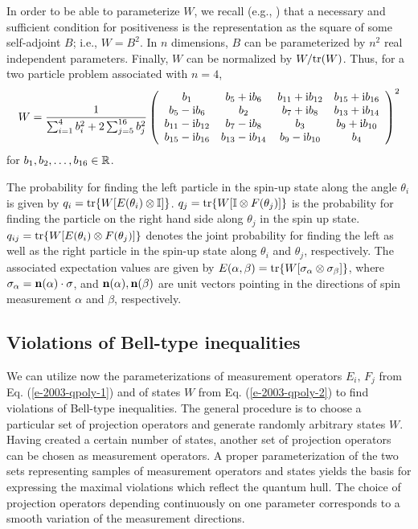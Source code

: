 In order to be able to parameterize $W$,
we recall (e.g., \cite[\S 72]{halmos-vs})
that a necessary and sufficient condition for
positiveness is the representation as the square of
some self-adjoint $B$; i.e., $W=B^2$.
In $n$ dimensions, $B$ can be parameterized by $n^2$
real independent parameters. Finally, $W$ can be normalized
by $W/ {\rm tr}(W)$.
Thus, for a two particle problem associated with $n=4$,
\begin{equation}
    \label{e-2003-qpoly-2}
    W=\frac{1}{\sum_{i=1}^4 b_i^2 + 2 \sum_{j=5}^{16} b_j^2}\left(\begin{array}{cccc}
        b_1 & b_5 + {\rm i}b_6 & b_{11} + {\rm i}b_{12} & b_{15} + {\rm i}b_{16}\\
        b_5 - {\rm i}b_6 & b_2 & b_7 + {\rm i}b_8 & b_{13} + {\rm i}b_{14}\\
        b_{11} - {\rm i}b_{12} & b_7 - {\rm i}b_8 & b_3 & b_9 + {\rm i}b_{10}\\
        b_{15} - {\rm i}b_{16} & b_{13} - {\rm i}b_{14} & b_9 - {\rm i}b_{10} &b_4
      \end{array}\right)^2
\end{equation}
for $b_1,b_2,\ldots ,b_{16}\in {\Bbb R}$.

The probability for finding the left particle in the spin-up state
along the angle $\theta_i$ is given  by
$q_i = {\rm tr}\{{W} [{E}(\theta_i) \otimes {\Bbb I}]\}$.
$q_j = {\rm tr}\{{W} [{\Bbb I} \otimes {F}(\theta_j)]\}$ is
the probability for finding the particle on the right hand side along $\theta_j$ in the
spin up state.
$q_{ij} = {\rm tr}\{{W} [{E}(\theta_i) \otimes {F}(\theta_j)]\}$ denotes the joint probability
for finding the left as well as the right particle in the spin-up state along $\theta_i$ and $\theta_j$,
respectively.
The associated expectation values are given by
$E(\alpha,\beta)={\rm tr}\{{W} [{\bf \sigma}_\alpha  \otimes
{\bf \sigma}_\beta ]\}$,
where $\sigma_\alpha= {\bf n}(\alpha )\cdot {\bf \sigma}$,
and ${\bf n}(\alpha ),{\bf n}(\beta )$
are unit vectors pointing in the directions
of spin measurement $\alpha$ and $\beta$, respectively.

\subsection{Violations of Bell-type inequalities}
We can utilize now the parameterizations of measurement operators
$E_i,\,F_j$ from Eq. (\ref{e-2003-qpoly-1})
and of states $W$ from Eq. (\ref{e-2003-qpoly-2})
to find violations of Bell-type
inequalities.
The general procedure is to choose a particular set of
projection operators and generate randomly arbitrary states $W$.
Having created a certain number of states, another set of
projection operators can be chosen as measurement operators.
A proper parameterization of the two sets representing samples of
measurement operators and states yields the basis
for expressing the maximal violations which reflect the quantum hull.
The choice of projection operators depending continuously on one
parameter corresponds to a smooth variation of the measurement
directions.

